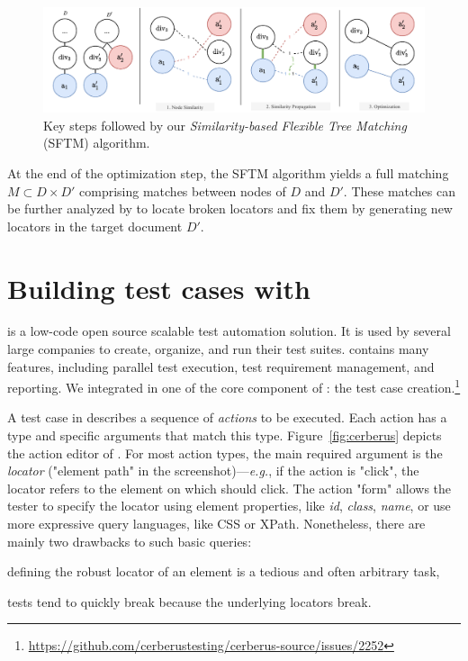 \documentclass[10pt,conference]{IEEEtran}
\begin{document}
\begin{figure}[!t]
    \centering
    \includegraphics[width=0.8\linewidth]{explanations/sftm}
    \caption{Key steps followed by our \emph{Similarity-based Flexible Tree Matching} (SFTM) algorithm.}
    \label{fig:steps_sftm}
\end{figure}

At the end of the optimization step, the SFTM algorithm yields a full matching $M \subset D \times D' $ comprising matches between nodes of $D$ and $D'$.
These matches can be further analyzed by \erratum{} to locate broken locators and fix them by generating new locators in the target document $D'$.

\section{Building test cases with \cerberus}\label{sec:cerberus}
\cerberus is a low-code open source scalable test automation solution.
It is used by several large companies to create, organize, and run their test suites.
\cerberus contains many features, including parallel test execution, test requirement management, and reporting.
We integrated \erratum in one of the core component of \cerberus: the test case creation.\footnote{\url{https://github.com/cerberustesting/cerberus-source/issues/2252}}

A test case in \cerberus describes a sequence of \textit{actions} to be executed.
Each action has a type and specific arguments that match this type.
Figure~\ref{fig:cerberus} depicts the action editor of \cerberus.
For most action types, the main required argument is the \textit{locator} ("element path" in the screenshot)---\emph{e.g.}, if the action is "click", the locator refers to the element on which \cerberus should click.
The action "form" allows the tester to specify the locator using element properties, like \textit{id}, \textit{class}, \textit{name}, or use more expressive query languages, like CSS or XPath.
Nonetheless, there are mainly two drawbacks to such basic queries:
\begin{compactitem}
    \item defining the robust locator of an element is a tedious and often arbitrary task,
    \item tests tend to quickly break because the underlying locators break.
\end{compactitem}
\end{document}
